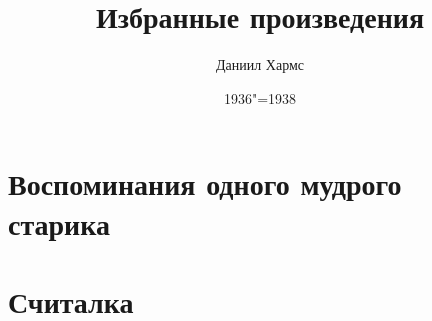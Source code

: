 \documentclass[a4paper,12pt]{article}
\title{Избранные произведения}
\author{Даниил Хармс}
\date{1936"=1938}
\begin{document}
\maketitle

\section{Воспоминания одного мудрого старика}


\section{Считалка}

\end{document}
